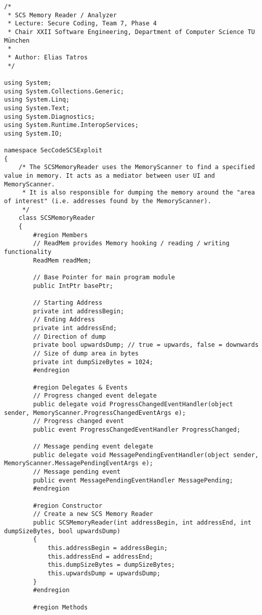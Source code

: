 \begin{lstlisting}
/* 
 * SCS Memory Reader / Analyzer
 * Lecture: Secure Coding, Team 7, Phase 4
 * Chair XXII Software Engineering, Department of Computer Science TU München
 *
 * Author: Elias Tatros
 */

using System;
using System.Collections.Generic;
using System.Linq;
using System.Text;
using System.Diagnostics;
using System.Runtime.InteropServices;
using System.IO;

namespace SecCodeSCSExploit
{
    /* The SCSMemoryReader uses the MemoryScanner to find a specified value in memory. It acts as a mediator between user UI and MemoryScanner.
     * It is also responsible for dumping the memory around the "area of interest" (i.e. addresses found by the MemoryScanner).
     */
    class SCSMemoryReader
    {
        #region Members
        // ReadMem provides Memory hooking / reading / writing functionality
        ReadMem readMem;

        // Base Pointer for main program module
        public IntPtr basePtr;

        // Starting Address
        private int addressBegin;
        // Ending Address
        private int addressEnd;
        // Direction of dump
        private bool upwardsDump; // true = upwards, false = downwards
        // Size of dump area in bytes
        private int dumpSizeBytes = 1024;
        #endregion

        #region Delegates & Events
        // Progress changed event delegate
        public delegate void ProgressChangedEventHandler(object sender, MemoryScanner.ProgressChangedEventArgs e);
        // Progress changed event
        public event ProgressChangedEventHandler ProgressChanged;

        // Message pending event delegate
        public delegate void MessagePendingEventHandler(object sender, MemoryScanner.MessagePendingEventArgs e);
        // Message pending event
        public event MessagePendingEventHandler MessagePending;
        #endregion

        #region Constructor
        // Create a new SCS Memory Reader
        public SCSMemoryReader(int addressBegin, int addressEnd, int dumpSizeBytes, bool upwardsDump)
        {
            this.addressBegin = addressBegin;
            this.addressEnd = addressEnd;
            this.dumpSizeBytes = dumpSizeBytes;
            this.upwardsDump = upwardsDump;
        }
        #endregion

        #region Methods


\end{lstlisting}
